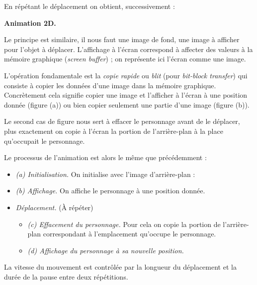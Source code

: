 \documentclass[11pt,class=report,crop=false]{standalone}
\begin{document}
En répétant le déplacement on obtient, successivement :


\bigskip

\textbf{Animation 2D.}

Le principe est similaire, il nous faut une image de fond, une image à afficher pour l'objet à déplacer.
L'affichage à l'écran correspond à affecter des valeurs à la mémoire graphique (\emph{screen buffer}) ; on représente ici l'écran comme une image.



L'opération fondamentale est la \emph{copie rapide} ou \emph{blit} (pour \emph{bit-block transfer}) qui consiste à copier les données d'une image dans la mémoire graphique. 
Concrètement cela signifie copier une image et l'afficher à l'écran à une position donnée (figure (a)) ou bien copier seulement une partie d'une image (figure (b)).



Le second cas de figure nous sert à effacer le personnage avant de le déplacer, plus exactement on copie à l'écran la portion de l'arrière-plan à la place qu'occupait le personnage.

Le processus de l'animation est alors le même que précédemment :
\begin{itemize}
	\item \emph{(a) Initialisation.}
	On initialise  avec l'image d'arrière-plan  :
	
	\item \emph{(b) Affichage.} On affiche le personnage à une position donnée.
	
	\item \emph{Déplacement.} (À répéter)
	\begin{itemize}
		\item \emph{(c) Effacement du personnage.} Pour cela on copie la portion de l'arrière-plan correspondant à l'emplacement qu'occupe le personnage.
		
		\item \emph{(d) Affichage du personnage à sa nouvelle position.}
	\end{itemize}
	
\end{itemize}

La vitesse du mouvement est contrôlée par la longueur du déplacement et la durée de la pause  entre deux répétitions.



\end{document}
